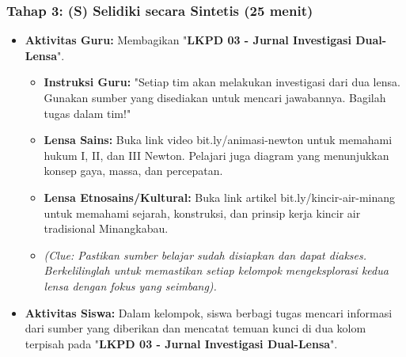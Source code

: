 \documentclass[a4paper,12pt]{article}
\begin{document}
\subsubsection{Tahap 3: (S) Selidiki secara Sintetis (25 menit)}
\begin{itemize}
\item \textbf{Aktivitas Guru:} Membagikan "\textbf{LKPD 03 - Jurnal Investigasi Dual-Lensa}".
    \begin{itemize}
    \item \textbf{Instruksi Guru:} "Setiap tim akan melakukan investigasi dari dua lensa. Gunakan sumber yang disediakan untuk mencari jawabannya. Bagilah tugas dalam tim!"
    \item \textbf{Lensa Sains:} Buka link video bit.ly/animasi-newton untuk memahami hukum I, II, dan III Newton. Pelajari juga diagram yang menunjukkan konsep gaya, massa, dan percepatan.
    \item \textbf{Lensa Etnosains/Kultural:} Buka link artikel bit.ly/kincir-air-minang untuk memahami sejarah, konstruksi, dan prinsip kerja kincir air tradisional Minangkabau.
    \item \textit{(Clue: Pastikan sumber belajar sudah disiapkan dan dapat diakses. Berkelilinglah untuk memastikan setiap kelompok mengeksplorasi kedua lensa dengan fokus yang seimbang).}
    \end{itemize}
\item \textbf{Aktivitas Siswa:} Dalam kelompok, siswa berbagi tugas mencari informasi dari sumber yang diberikan dan mencatat temuan kunci di dua kolom terpisah pada "\textbf{LKPD 03 - Jurnal Investigasi Dual-Lensa}".
\end{itemize}
\end{document}
